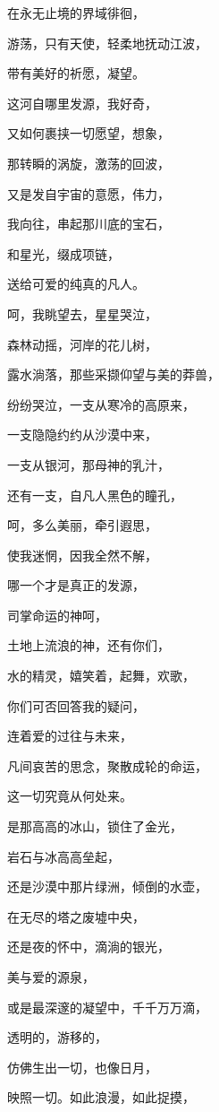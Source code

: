 \documentclass[UTF8]{article}
\begin{document}
\par 在永无止境的界域徘徊，
\par 游荡，只有天使，轻柔地抚动江波，
\par 带有美好的祈愿，凝望。
\par 这河自哪里发源，我好奇，
\par 又如何裹挟一切愿望，想象，
\par 那转瞬的涡旋，激荡的回波，
\par 又是发自宇宙的意愿，伟力，
\par 我向往，串起那川底的宝石，
\par 和星光，缀成项链，
\par 送给可爱的纯真的凡人。
\par 呵，我眺望去，星星哭泣，
\par 森林动摇，河岸的花儿树，
\par 露水淌落，那些采撷仰望与美的莽兽，
\par 纷纷哭泣，一支从寒冷的高原来，
\par 一支隐隐约约从沙漠中来，
\par 一支从银河，那母神的乳汁，
\par 还有一支，自凡人黑色的瞳孔，
\par 呵，多么美丽，牵引遐思，
\par 使我迷惘，因我全然不解，
\par 哪一个才是真正的发源，
\par 司掌命运的神呵，
\par 土地上流浪的神，还有你们，
\par 水的精灵，嬉笑着，起舞，欢歌，
\par 你们可否回答我的疑问，
\par 连着爱的过往与未来，
\par 凡间哀苦的思念，聚散成轮的命运，
\par 这一切究竟从何处来。
\par 是那高高的冰山，锁住了金光，
\par 岩石与冰高高垒起，
\par 还是沙漠中那片绿洲，倾倒的水壶，
\par 在无尽的塔之废墟中央，
\par 还是夜的怀中，滴淌的银光，
\par 美与爱的源泉，
\par 或是最深邃的凝望中，千千万万滴，
\par 透明的，游移的，
\par 仿佛生出一切，也像日月，
\par 映照一切。如此浪漫，如此捉摸，
\end{document}
